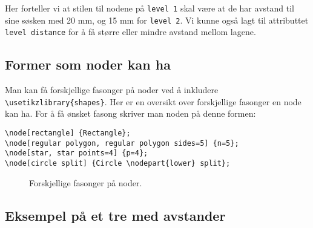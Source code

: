 \documentclass[12pt, a4paper]{article}
\begin{document}
Her forteller vi at stilen til nodene på \texttt{level 1} skal være at de har avstand til sine søsken med 20 mm, og 15 mm for \texttt{level 2}. Vi kunne også lagt til attributtet \texttt{level distance} for å få større eller mindre avstand mellom lagene. 

\newpage

\subsection{Former som noder kan ha}
Man kan få forskjellige fasonger på noder ved å inkludere \texttt{\textbackslash usetikzlibrary\{shapes\}}. Her er en oversikt over forskjellige fasonger en node kan ha. For å få ønsket fasong skriver man noden på denne formen:
\begin{Verbatim}[fontsize=\small, frame=single]
\node[rectangle] {Rectangle};
\node[regular polygon, regular polygon sides=5] {n=5};
\node[star, star points=4] {p=4};
\node[circle split] {Circle \nodepart{lower} split};
\end{Verbatim}

\begin{figure}[h!]
\centering
{}
\caption{Forskjellige fasonger på noder.}
\end{figure}


\newpage

\subsection{Eksempel på et tre med avstander}
\end{document}
